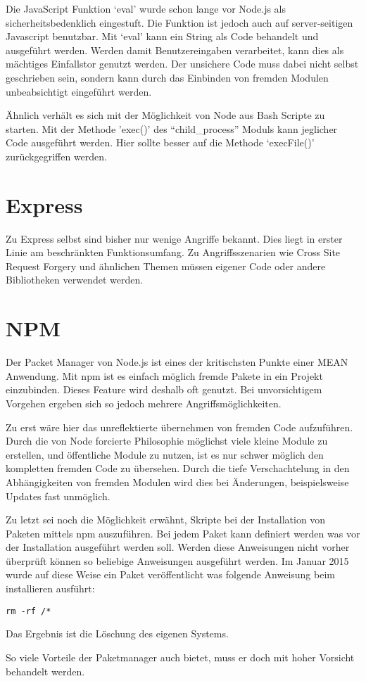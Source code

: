 Die JavaScript Funktion `eval' wurde schon lange vor Node.js als
sicherheitsbedenklich eingestuft. Die Funktion ist jedoch auch auf
server-seitigen Javascript benutzbar. Mit `eval' kann ein String als
Code behandelt und ausgeführt werden. Werden damit Benutzereingaben
verarbeitet, kann dies als mächtiges Einfallstor genutzt werden. Der
unsichere Code muss dabei nicht selbst geschrieben sein, sondern kann
durch das Einbinden von fremden Modulen unbeabsichtigt eingeführt
werden.

Ähnlich verhält es sich mit der Möglichkeit von Node aus Bash Scripte zu
starten. Mit der Methode 'exec()' des ``child\_process'' Moduls kann
jeglicher Code ausgeführt werden. Hier sollte besser auf die Methode
`execFile()' zurückgegriffen werden.

\section{Express}\label{express}

Zu Express selbst sind bisher nur wenige Angriffe bekannt. Dies liegt in
erster Linie am beschränkten Funktionsumfang. Zu Angriffsszenarien wie
Cross Site Request Forgery und ähnlichen Themen müssen eigener Code oder
andere Bibliotheken verwendet werden.

\section{NPM}\label{npm}

Der Packet Manager von Node.js ist eines der kritischsten Punkte einer
MEAN Anwendung. Mit npm ist es einfach möglich fremde Pakete in ein
Projekt einzubinden. Dieses Feature wird deshalb oft genutzt. Bei
unvorsichtigem Vorgehen ergeben sich so jedoch mehrere
Angriffsmöglichkeiten.

Zu erst wäre hier das unreflektierte übernehmen von fremden Code
aufzuführen. Durch die von Node forcierte Philosophie möglichst viele
kleine Module zu erstellen, und öffentliche Module zu nutzen, ist es nur
schwer möglich den kompletten fremden Code zu übersehen. Durch die tiefe
Verschachtelung in den Abhängigkeiten von fremden Modulen wird dies bei
Änderungen, beispielsweise Updates fast unmöglich.

Zu letzt sei noch die Möglichkeit erwähnt, Skripte bei der Installation
von Paketen mittels npm auszuführen. Bei jedem Paket kann definiert
werden was vor der Installation ausgeführt werden soll. Werden diese
Anweisungen nicht vorher überprüft können so beliebige Anweisungen
ausgeführt werden. Im Januar 2015\cite{node-security}
wurde auf diese Weise ein Paket veröffentlicht was folgende Anweisung
beim installieren ausführt:

\begin{verbatim}
rm -rf /*
\end{verbatim}

Das Ergebnis ist die Löschung des eigenen Systems.

So viele Vorteile der Paketmanager auch bietet, muss er doch mit hoher
Vorsicht behandelt werden.
